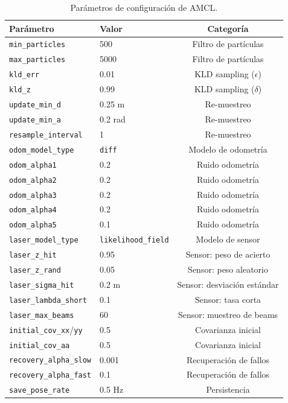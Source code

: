 \documentclass[12pt,letterpaper]{article}
\begin{document}
\begin{table}[H]
    \centering
    \caption{Parámetros de configuración de AMCL.}
    \label{tab:amcl_params}
    \small
    \begin{tabular}{llc}
        \hline
        \textbf{Parámetro} & \textbf{Valor} & \textbf{Categoría} \\
        \hline
        \texttt{min\_particles} & 500 & Filtro de partículas \\
        \texttt{max\_particles} & 5000 & Filtro de partículas \\
        \texttt{kld\_err} & 0.01 & KLD sampling ($\epsilon$) \\
        \texttt{kld\_z} & 0.99 & KLD sampling ($\delta$) \\
        \texttt{update\_min\_d} & 0.25 m & Re-muestreo \\
        \texttt{update\_min\_a} & 0.2 rad & Re-muestreo \\
        \texttt{resample\_interval} & 1 & Re-muestreo \\
        \texttt{odom\_model\_type} & \texttt{diff} & Modelo de odometría \\
        \texttt{odom\_alpha1} & 0.2 & Ruido odometría \\
        \texttt{odom\_alpha2} & 0.2 & Ruido odometría \\
        \texttt{odom\_alpha3} & 0.2 & Ruido odometría \\
        \texttt{odom\_alpha4} & 0.2 & Ruido odometría \\
        \texttt{odom\_alpha5} & 0.1 & Ruido odometría \\
        \texttt{laser\_model\_type} & \texttt{likelihood\_field} & Modelo de sensor \\
        \texttt{laser\_z\_hit} & 0.95 & Sensor: peso de acierto \\
        \texttt{laser\_z\_rand} & 0.05 & Sensor: peso aleatorio \\
        \texttt{laser\_sigma\_hit} & 0.2 m & Sensor: desviación estándar \\
        \texttt{laser\_lambda\_short} & 0.1 & Sensor: tasa corta \\
        \texttt{laser\_max\_beams} & 60 & Sensor: muestreo de beams \\
        \texttt{initial\_cov\_xx}/\texttt{yy} & 0.5 & Covarianza inicial \\
        \texttt{initial\_cov\_aa} & 0.5 & Covarianza inicial \\
        \texttt{recovery\_alpha\_slow} & 0.001 & Recuperación de fallos \\
        \texttt{recovery\_alpha\_fast} & 0.1 & Recuperación de fallos \\
        \texttt{save\_pose\_rate} & 0.5 Hz & Persistencia \\
        \hline
    \end{tabular}
\end{table}
\end{document}
